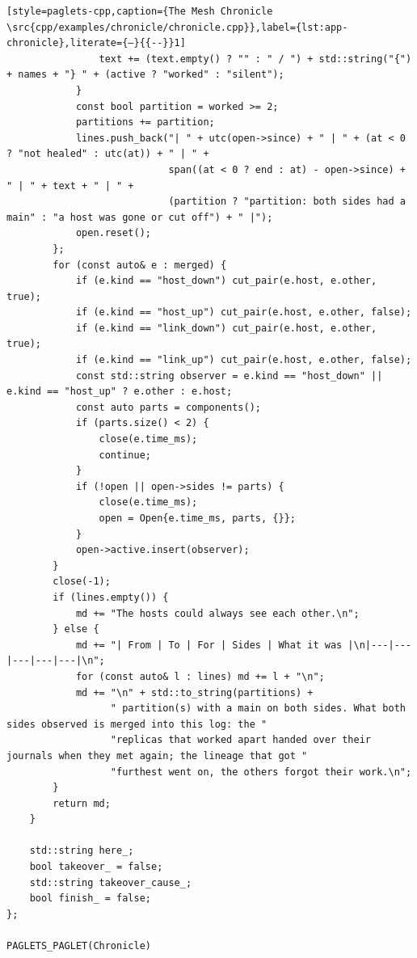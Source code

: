 \begin{lstlisting}[style=paglets-cpp,caption={The Mesh Chronicle \src{cpp/examples/chronicle/chronicle.cpp}},label={lst:app-chronicle},literate={–}{{--}}1]
                text += (text.empty() ? "" : " / ") + std::string("{") + names + "} " + (active ? "worked" : "silent");
            }
            const bool partition = worked >= 2;
            partitions += partition;
            lines.push_back("| " + utc(open->since) + " | " + (at < 0 ? "not healed" : utc(at)) + " | " +
                            span((at < 0 ? end : at) - open->since) + " | " + text + " | " +
                            (partition ? "partition: both sides had a main" : "a host was gone or cut off") + " |");
            open.reset();
        };
        for (const auto& e : merged) {
            if (e.kind == "host_down") cut_pair(e.host, e.other, true);
            if (e.kind == "host_up") cut_pair(e.host, e.other, false);
            if (e.kind == "link_down") cut_pair(e.host, e.other, true);
            if (e.kind == "link_up") cut_pair(e.host, e.other, false);
            const std::string observer = e.kind == "host_down" || e.kind == "host_up" ? e.other : e.host;
            const auto parts = components();
            if (parts.size() < 2) {
                close(e.time_ms);
                continue;
            }
            if (!open || open->sides != parts) {
                close(e.time_ms);
                open = Open{e.time_ms, parts, {}};
            }
            open->active.insert(observer);
        }
        close(-1);
        if (lines.empty()) {
            md += "The hosts could always see each other.\n";
        } else {
            md += "| From | To | For | Sides | What it was |\n|---|---|---|---|---|\n";
            for (const auto& l : lines) md += l + "\n";
            md += "\n" + std::to_string(partitions) +
                  " partition(s) with a main on both sides. What both sides observed is merged into this log: the "
                  "replicas that worked apart handed over their journals when they met again; the lineage that got "
                  "furthest went on, the others forgot their work.\n";
        }
        return md;
    }

    std::string here_;
    bool takeover_ = false;
    std::string takeover_cause_;
    bool finish_ = false;
};

PAGLETS_PAGLET(Chronicle)
\end{lstlisting}

